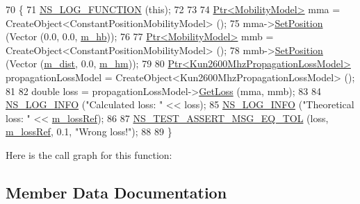 \begin{DoxyCode}
70 \{
71   \hyperlink{log-macros-disabled_8h_a90b90d5bad1f39cb1b64923ea94c0761}{NS\_LOG\_FUNCTION} (\textcolor{keyword}{this});
72 
73 
74   \hyperlink{classns3_1_1Ptr}{Ptr<MobilityModel>} mma = CreateObject<ConstantPositionMobilityModel> ();
75   mma->\hyperlink{classns3_1_1MobilityModel_ac584b3d5a309709d2f13ed6ada1e7640}{SetPosition} (Vector (0.0, 0.0, \hyperlink{classKun2600MhzPropagationLossModelTestCase_a70321e779e39cca996a1bfcdd46b72a6}{m\_hb}));
76 
77   \hyperlink{classns3_1_1Ptr}{Ptr<MobilityModel>} mmb = CreateObject<ConstantPositionMobilityModel> ();
78   mmb->\hyperlink{classns3_1_1MobilityModel_ac584b3d5a309709d2f13ed6ada1e7640}{SetPosition} (Vector (\hyperlink{classKun2600MhzPropagationLossModelTestCase_aa48e852a4db7a04367049e2fb7877db8}{m\_dist}, 0.0, \hyperlink{classKun2600MhzPropagationLossModelTestCase_a60a374a3ca4a03f1e85b4fe2574aeebc}{m\_hm}));
79 
80   \hyperlink{classns3_1_1Ptr}{Ptr<Kun2600MhzPropagationLossModel>} propagationLossModel = 
      CreateObject<Kun2600MhzPropagationLossModel> ();
81 
82   \textcolor{keywordtype}{double} loss = propagationLossModel->\hyperlink{classns3_1_1Kun2600MhzPropagationLossModel_a6ca564e4f91bd979af59431ae2a9e0d8}{GetLoss} (mma, mmb);
83 
84   \hyperlink{group__logging_gafbd73ee2cf9f26b319f49086d8e860fb}{NS\_LOG\_INFO} (\textcolor{stringliteral}{"Calculated loss: "} << loss);
85   \hyperlink{group__logging_gafbd73ee2cf9f26b319f49086d8e860fb}{NS\_LOG\_INFO} (\textcolor{stringliteral}{"Theoretical loss: "} << \hyperlink{classKun2600MhzPropagationLossModelTestCase_acd258e14ea3b997fa29dae29e1c2b2fb}{m\_lossRef});
86  
87   \hyperlink{group__testing_ga9e7861b56b4e70db3b56044cb7a28e41}{NS\_TEST\_ASSERT\_MSG\_EQ\_TOL} (loss, \hyperlink{classKun2600MhzPropagationLossModelTestCase_acd258e14ea3b997fa29dae29e1c2b2fb}{m\_lossRef}, 0.1, \textcolor{stringliteral}{"Wrong loss!"});
88 
89 \}
\end{DoxyCode}


Here is the call graph for this function\+:




\subsection{Member Data Documentation}
